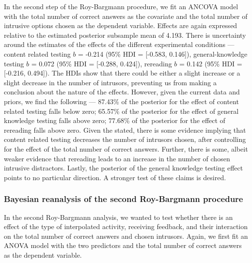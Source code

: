 \documentclass[../main.tex]{subfiles}
\begin{document}
In the second step of the Roy-Bargmann procedure, we fit an ANCOVA model
with the total number of correct answers as the covariate and the total
number of intrusive options chosen as the dependent variable. Effects
are again expressed relative to the estimated posterior subsample mean
of 4.193. There is uncertainty around the estimates of the effects of
the different experimental conditions --- content related testing \(b\)
= -0.214 (95\% HDI = {[}-0.583, 0.146{]}), general-knowledge testing
\(b\) = 0.072 (95\% HDI = {[}-0.288, 0.424{]}), rereading \(b\) = 0.142
(95\% HDI = {[}-0.216, 0.494{]}). The HDIs show that there could be
either a slight increase or a slight decrease in the number of
intrusors, preventing us from making a conclusion about the nature of
the effects. However, given the current data and priors, we find the
following --- 87.43\% of the posterior for the effect of content related
testing falls below zero; 65.57\% of the posterior for the effect of
general knowledge testing falls above zero; 77.68\% of the posterior for
the effect of rereading falls above zero. Given the stated, there is
some evidence implying that content related testing decreases the number
of intrusors chosen, after controlling for the effect of the total
number of correct answers. Further, there is some, albeit weaker
evidence that rereading leads to an increase in the number of chosen
intrusive distractors. Lastly, the posterior of the general knowledge
testing effect points to no particular direction. A stronger test of
these claims is desired.

\hypertarget{bayesian-reanalysis-of-the-second-roy-bargmann-procedure}{%
\subsubsection{Bayesian reanalysis of the second Roy-Bargmann
procedure}\label{bayesian-reanalysis-of-the-second-roy-bargmann-procedure}}

In the second Roy-Bargmann analysis, we wanted to test whether there is
an effect of the type of interpolated activity, receiving feedback, and
their interaction on the total number of correct answers and chosen
intrusors. Again, we first fit an ANOVA model with the two predictors
and the total number of correct answers as the dependent variable.
\end{document}
